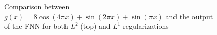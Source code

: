 \documentclass[11pt]{article}
\begin{document}
 \begin{figure}[!htb]
    \centering
    \caption{Comparison between $g(x) = 8 \cos(4\pi x) + \sin(2\pi x) + \sin(\pi x)$ and the output of the FNN for both $L^2$ (top) and $L^1$ regularizations}
    \label{fig:fourvsNN_outside}
\end{figure}
\end{document}
